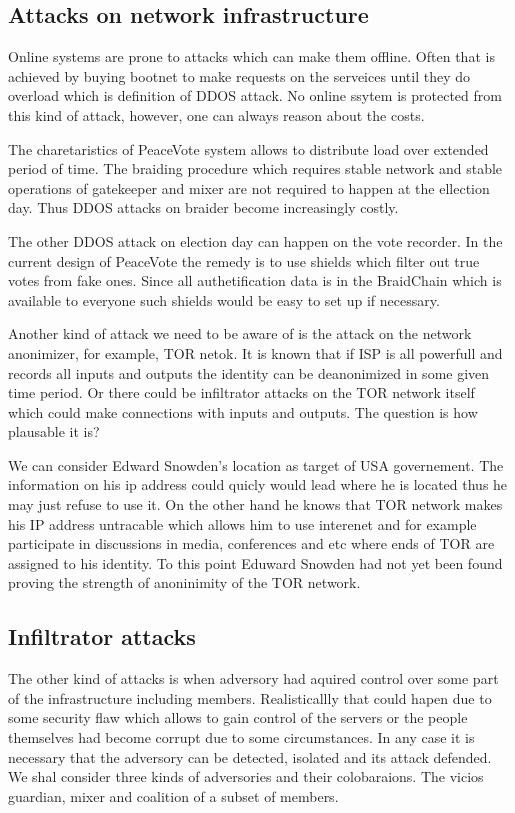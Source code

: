 \documentclass{article}
\begin{document}
\subsection{Attacks on network infrastructure}

Online systems are prone to attacks which can make them offline. Often that is achieved by buying bootnet to make requests on the serveices until they do overload which is definition of DDOS attack. No online ssytem is protected from this kind of attack, however, one can always reason about the costs.

The charetaristics of PeaceVote system allows to distribute load over extended period of time. The braiding procedure which requires stable network and stable operations of gatekeeper and mixer are not required to happen at the ellection day. Thus DDOS attacks on braider become increasingly costly.

The other DDOS attack on election day can happen on the vote recorder. In the current design of PeaceVote the remedy is to use shields which filter out true votes from fake ones. Since all authetification data is in the BraidChain which is available to everyone such shields would be easy to set up if necessary.

Another kind of attack we need to be aware of is the attack on the network anonimizer, for example, TOR netok. It is known that if ISP is all powerfull and records all inputs and outputs the identity can be deanonimized in some given time period. Or there could be infiltrator attacks on the TOR network itself which could make connections with inputs and outputs. The question is how plausable it is?

We can consider Edward Snowden's location as target of USA governement. The information on his ip address could quicly would lead where he is located thus he may just refuse to use it. On the other hand he knows that TOR network makes his IP address untracable which allows him to use interenet and for example participate in discussions in media, conferences and etc where ends of TOR are assigned to his identity. To this point Eduward Snowden had not yet been found proving the strength of anoninimity of the TOR network. 

\subsection{Infiltrator attacks}

The other kind of attacks is when adversory had aquired control over some part of the infrastructure including members. Realisticallly that could hapen due to some security flaw which allows to gain control of the servers or the people themselves had become corrupt due to some circumstances. In any case it is necessary that the adversory can be detected, isolated and its attack defended. We shal consider three kinds of adversories and their colobaraions. The vicios guardian, mixer and coalition of a subset of members.
\end{document}
